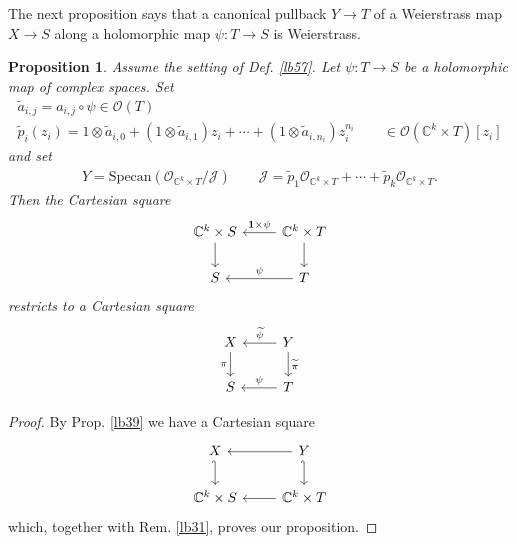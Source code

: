 \documentclass[12pt,b5paper,notitlepage]{report}
\theoremstyle{definition}
\theoremstyle{plain}
\newtheorem{pp}[df]{Proposition}
\newcommand{\mc}{\mathcal}
\newcommand{\wtd}{\widetilde}
\newcommand{\id}{\mathbf{1}}
\newcommand{\scr}{\mathscr}
\newcommand{\Cbb}{\mathbb C}
\newcommand{\Specan}{\mathrm{Specan}}
\numberwithin{equation}{section}
\begin{document}
The next proposition says that a canonical pullback $Y\rightarrow T$ of a Weierstrass map $X\rightarrow S$ along a holomorphic map $\psi:T\rightarrow S$ is Weierstrass.
\begin{pp}\label{lb66}
Assume the setting of Def. \ref{lb57}. Let $\psi:T\rightarrow S$ be a holomorphic map of complex spaces. Set
\begin{gather*}
\wtd a_{i,j}=a_{i,j}\circ\psi\in\scr O(T)\\
\wtd p_i(z_i)=1\otimes \wtd a_{i,0}+(1\otimes \wtd a_{i,1})z_i+\cdots +(1\otimes \wtd a_{i,n_i})z_i^{n_i}\qquad\in \scr O(\Cbb^k\times T)[z_i]
\end{gather*}
and set
\begin{gather}
Y=\Specan(\scr O_{\Cbb^k\times T}/\mc J)\qquad \mc J=\wtd p_1\scr O_{\Cbb^k\times T}+\cdots+\wtd p_k\scr O_{\Cbb^k\times T}.
\end{gather}
Then the Cartesian square
\begin{equation*}
\begin{tikzcd}
\Cbb^k\times S \arrow[d] & \Cbb^k\times T \arrow[l, "\id\times\psi"'] \arrow[d] \\
S          & T \arrow[l, "\psi"']          
\end{tikzcd}
\end{equation*}
restricts to a Cartesian square
\begin{equation*}
\begin{tikzcd}
X \arrow[d,"\pi"'] & Y\arrow[l,"\wtd\psi"'] \arrow[d,"\wtd\pi"] \\
S          & T \arrow[l, "\psi"']          
\end{tikzcd}
\end{equation*}
\end{pp}


\begin{proof}
By Prop. \ref{lb39} we have a Cartesian square
\begin{equation*}
\begin{tikzcd}
X \arrow[d,hook'] & Y \arrow[d,hook'] \arrow[l] \\
\Cbb^k\times S           & \Cbb^k\times T \arrow[l]          
\end{tikzcd}
\end{equation*}
which, together with Rem. \ref{lb31}, proves our proposition.
\end{proof}
\end{document}
